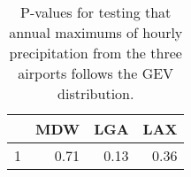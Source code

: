\begin{table}[ht]
\centering
\begin{tabular}{rrrr}
  \hline
 & MDW & LGA & LAX \\ 
  \hline
1 & 0.71 & 0.13 & 0.36 \\ 
   \hline
\end{tabular}
\caption{P-values for testing that annual maximums of hourly 
            precipitation from the three airports follows the GEV distribution.} 
\end{table}

